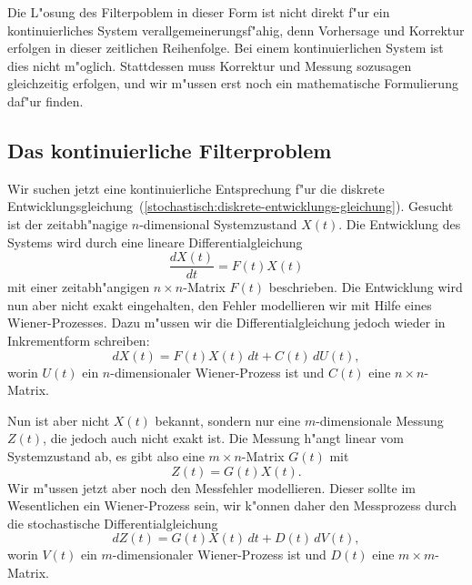 Die L"osung des Filterpoblem in dieser Form ist nicht direkt f"ur ein
kontinuierliches System verallgemeinerungsf"ahig, denn Vorhersage und 
Korrektur erfolgen in dieser zeitlichen Reihenfolge.
Bei einem kontinuierlichen System ist dies nicht m"oglich.
Stattdessen muss Korrektur und Messung sozusagen gleichzeitig erfolgen,
und wir m"ussen erst noch ein mathematische Formulierung daf"ur finden.

%
%
\subsection{Das kontinuierliche Filterproblem}
Wir suchen jetzt eine kontinuierliche Entsprechung f"ur die diskrete
Entwicklungsgleichung~(\ref{stochastisch:diskrete-entwicklungs-gleichung}).
Gesucht ist der zeitabh"nagige $n$-dimensional Systemzustand $X(t)$. 
Die Entwicklung des Systems wird durch eine lineare Differentialgleichung
\[
\frac{dX(t)}{dt}
=
F(t) X(t)
\]
mit einer zeitabh"angigen $n\times n$-Matrix $F(t)$ beschrieben.
Die Entwicklung wird nun aber nicht exakt eingehalten, den Fehler
modellieren wir mit Hilfe eines Wiener-Prozesses.
Dazu m"ussen wir die Differentialgleichung jedoch wieder in Inkrementform
schreiben:
\begin{equation}
dX(t) = F(t) X(t)\,dt + C(t)\, dU(t),
\label{stochastisch:kontinuierliche-zeitentwicklung}
\end{equation}
worin $U(t)$ ein $n$-dimensionaler Wiener-Prozess ist und $C(t)$
eine $n\times n$-Matrix.

Nun ist aber nicht $X(t)$ bekannt, sondern nur eine $m$-dimensionale
Messung $Z(t)$, die jedoch auch nicht exakt ist.
Die Messung h"angt linear vom Systemzustand ab, es gibt also eine
$m\times n$-Matrix $G(t)$ mit 
\[
Z(t) = G(t) X(t).
\]
Wir m"ussen jetzt aber noch den Messfehler modellieren.
Dieser sollte im Wesentlichen ein Wiener-Prozess sein, wir k"onnen daher
den Messprozess durch die stochastische Differentialgleichung
\begin{equation}
dZ(t)
= 
G(t)X(t) \,dt +  D(t)\,dV(t),
\label{stochastisch:kontinuierlicher-messprozess}
\end{equation}
worin $V(t)$ ein $m$-dimensionaler Wiener-Prozess ist und $D(t)$ 
eine $m\times m$-Matrix.


